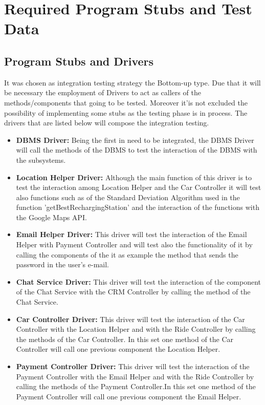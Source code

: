 \documentclass[a4paper]{article}
\begin{document}
\section{Required Program Stubs and Test Data}

\subsection{Program Stubs and Drivers}
It was chosen as integration testing strategy the Bottom-up type. Due that it will be necessary the employment of Drivers to act as callers of the methods/components that going to be tested. Moreover it'is not excluded the possibility of implementing some stubs as the testing phase is in process. The drivers that are listed below will compose the integration testing.
\begin{itemize}
\item \textbf{DBMS Driver:} Being the first in need to be integrated, the DBMS Driver will call the methods of the DBMS to test the interaction of the DBMS with the subsystems.

\item \textbf{Location Helper Driver:} Although the main function of this driver is to test the interaction among Location Helper and the Car Controller it will test also functions such as of the Standard Deviation Algorithm used in the function 'getBestRechargingStation' and the interaction of the functions with the Google Maps API.

\item \textbf{Email Helper Driver:} This driver will test the interaction of the Email Helper with Payment Controller and will test also the functionality of it by calling the components of the it as example the method that sends the password in the  user's e-mail.

\item \textbf{Chat Service Driver:} This driver will test the interaction of the component of the Chat Service with the CRM Controller by calling the method of the Chat Service.

\item \textbf{Car Controller Driver:} This driver will test the interaction of the  Car Controller with the Location Helper and with the Ride Controller by calling the methods of the Car Controller. In this set one method of the Car Controller will call one previous component the Location Helper.  
\item \textbf{Payment Controller Driver:} This driver will test the interaction of the Payment Controller with the Email Helper and with the Ride Controller by calling the methods of the Payment Controller.In this set one method of the Payment Controller will call one previous component the Email Helper.  


\end{itemize}
\end{document}

